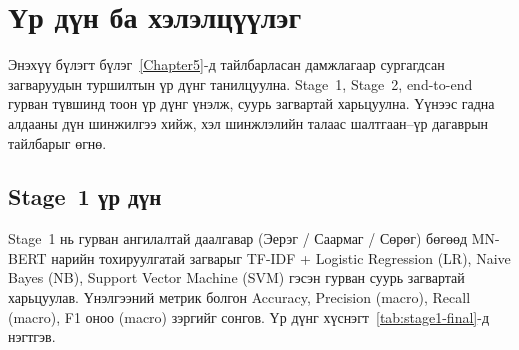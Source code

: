 ﻿%

\chapter{Үр дүн ба хэлэлцүүлэг}
\label{Chapter6}

Энэхүү бүлэгт бүлэг~\ref{Chapter5}-д тайлбарласан дамжлагаар сургагдсан
загваруудын туршилтын үр дүнг танилцуулна. Stage~1, Stage~2, end-to-end гурван
түвшинд тоон үр дүнг үнэлж, суурь загвартай харьцуулна. Үүнээс гадна алдааны
дүн шинжилгээ хийж, хэл шинжлэлийн талаас шалтгаан--үр дагаврын тайлбарыг өгнө.

\section{Stage~1 үр дүн}
\label{sec:stage1-results}

Stage~1 нь гурван ангилалтай даалгавар (Эерэг / Саармаг / Сөрөг) бөгөөд
MN-BERT нарийн тохируулгатай загварыг TF-IDF + Logistic Regression (LR), Naive Bayes (NB),
Support Vector Machine (SVM) гэсэн гурван суурь загвартай харьцуулав. Үнэлгээний
метрик болгон Accuracy, Precision (macro), Recall (macro), F1 оноо (macro) зэргийг
сонгов. Үр дүнг хүснэгт~\ref{tab:stage1-final}-д нэгтгэв.

\begin{table}[H]
\centering
\caption{Stage~1-ийн загваруудын харьцуулсан гүйцэтгэл (POS / NEU / NEG)}
\label{tab:stage1-final}
\end{table}


